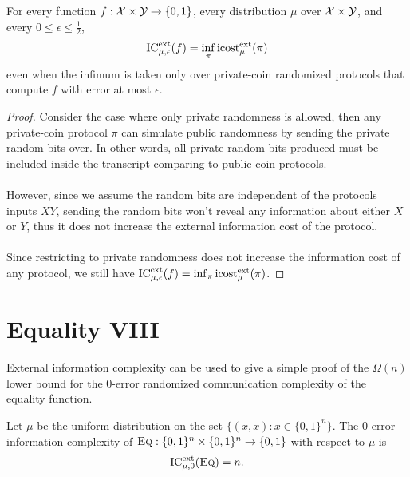 \begin{theorem}
	For every function $f : \mathcal{X} \times \mathcal{Y} \to \{0,1\}$, every distribution $\mu$ over $\mathcal{X} \times \mathcal{Y}$, and every $0 \le \epsilon \le \frac12$,
	\[
	\mathrm{IC}^{\mathrm{ext}}_{\mu,\epsilon}(f) = \inf_{\pi} \mathrm{icost}^{\mathrm{ext}}_\mu(\pi)
	\]
	even when the infimum is taken only over private-coin randomized protocols that compute $f$ with error at most $\epsilon$.
\end{theorem}

\begin{proof}
	Consider the case where only private randomness is allowed, then any private-coin protocol $\pi$ can simulate public randomness by sending the private random bits over. In other words, all private random bits produced must be included inside the transcript comparing to public coin protocols. \\
	\\
	However, since we assume the random bits are independent of the protocols inputs $XY$, sending the random bits won't reveal any information about either $X$ or $Y$, thus it does not increase the external information cost of the protocol.\\
	\\
	Since restricting to private randomness does not increase the information cost of any protocol, we still have $\mathrm{IC}^{\mathrm{ext}}_{\mu,\epsilon}(f) = \inf_{\pi} \mathrm{icost}^{\mathrm{ext}}_\mu(\pi)$.
\end{proof}



\section{Equality VIII}

External information complexity can be used to give a simple proof of the $\Omega(n)$ lower bound for the $0$-error randomized communication complexity of the equality function.

\begin{theorem}
	Let $\mu$ be the uniform distribution on the set $\{(x,x) : x \in \{0,1\}^n\}$. The $0$-error information complexity of $\textsc{Eq} : \{0,1\}^n \times \{0,1\}^n \to \{0,1\}$ with respect to $\mu$ is
	\[
	\mathrm{IC}^{\mathrm{ext}}_{\mu,0}(\textsc{Eq}) = n.
	\]
\end{theorem}

